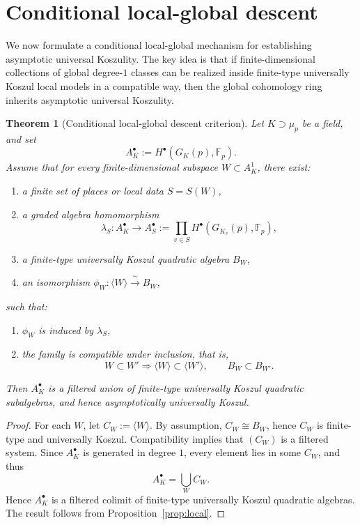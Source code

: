 \documentclass[11pt]{amsart}
\numberwithin{equation}{section}
\newtheorem{theorem}{Theorem}[section]
\theoremstyle{definition}
\begin{document}
	
	
	\section{Conditional local-global descent}
	
	We now formulate a conditional local-global mechanism for establishing asymptotic universal Koszulity. The key idea is that if finite-dimensional collections of global degree-$1$ classes can be realized inside finite-type universally Koszul local models in a compatible way, then the global cohomology ring inherits asymptotic universal Koszulity.
	
	
	\begin{theorem}[Conditional local-global descent criterion] \label{thm:local-global-descent}
		Let $K \supset \mu_p$ be a field, and set
		\[A_K^\bullet := H^\bullet(G_K(p),\mathbb{F}_p).\]
		Assume that for every finite-dimensional subspace $W \subset A_K^1$, there exist:
		\begin{enumerate}[label=(\roman*)]
			\item a finite set of places or local data $S=S(W)$,
			\item a graded algebra homomorphism
			\[\lambda_S \colon A_K^\bullet \longrightarrow A_S^\bullet := \prod_{v\in S} H^\bullet(G_{K_v}(p),\mathbb F_p), \]
			\item a finite-type universally Koszul quadratic algebra $B_W$,
			\item an isomorphism $\phi_W \colon \langle W\rangle \xrightarrow{\ \sim\ } B_W$,
		\end{enumerate}
		such that:
		\begin{enumerate}[label=\textnormal{(\alph*)}]
			\item $\phi_W$ is induced by $\lambda_S$,
			\item the family is compatible under inclusion, that is, 
			\[W \subset W' \Rightarrow \langle W\rangle \subset \langle W'\rangle, \qquad B_W \subset B_{W'}.\]
		\end{enumerate}
		Then $A_K^\bullet$ is a filtered union of finite-type universally Koszul quadratic subalgebras, and hence asymptotically universally Koszul.
	\end{theorem}
	
	\begin{proof}
		For each $W$, let $C_W := \langle W\rangle$. By assumption, $C_W \cong B_W$, hence $C_W$ is finite-type and universally Koszul. Compatibility implies that $(C_W)$ is a filtered system. Since $A_K^\bullet$ is generated in degree $1$, every element lies in some $C_W$, and thus
		\[A_K^\bullet = \bigcup_W C_W.\]
		Hence $A_K^\bullet$ is a filtered colimit of finite-type universally Koszul quadratic algebras. The result follows from Proposition~\ref{prop:local}.
	\end{proof}
	
\end{document}
